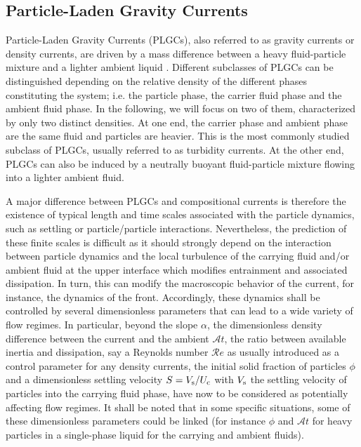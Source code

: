 \documentclass[12pt]{article}
\begin{document}
\subsection{Particle-Laden Gravity Currents}
\label{sec:intro_PLGC}

Particle-Laden Gravity Currents (PLGCs), also referred to as gravity currents or density currents, are driven by a mass difference between a heavy fluid-particle mixture and a lighter ambient liquid \citep[e.g.][]{Hopfinger1983, Middleton1993,Kneller2000, Meiburg2010,wells2021}. Different subclasses of PLGCs can be distinguished depending on the relative density of the different phases constituting the system; i.e. the particle phase, the carrier fluid phase and the ambient fluid phase. In the following, we will focus on two of them, characterized by only two distinct densities. At one end, the carrier phase and ambient phase are the same fluid and particles are heavier. This is the most commonly studied subclass of PLGCs, usually referred to as turbidity currents. At the other end, PLGCs can also be induced by a neutrally buoyant fluid-particle mixture flowing into a lighter ambient fluid.

A major difference between PLGCs and compositional currents is therefore the existence of typical length and time scales associated with the particle dynamics, such as settling or particle/particle interactions. Nevertheless, the prediction of these finite scales is difficult as it should strongly depend on the interaction between particle dynamics and the local turbulence of the carrying fluid and/or ambient fluid at the upper interface which modifies entrainment and associated dissipation. In turn, this can modify the macroscopic behavior of the current, for instance, the dynamics of the front. Accordingly, these dynamics shall be controlled by several dimensionless parameters that can lead to a wide variety of flow regimes. In particular, beyond the slope $\alpha$, the dimensionless density difference between the current and the ambient $\mathcal{A}t$, the ratio between available inertia and dissipation, say a Reynolds number $\mathcal{R}e$ as usually introduced as a control parameter for any density currents, the initial solid fraction of particles $\phi$ and a dimensionless settling velocity $S=V_{\text s}/U_{\text{c}}$ with $V_{\text s}$ the settling velocity of particles into the carrying fluid phase, have now to be considered as potentially affecting flow regimes. It shall be noted that in some specific situations, some of these dimensionless parameters could be linked (for instance $\phi$ and $\mathcal{A}t$ for heavy particles in a single-phase liquid for the carrying and ambient fluids).
\end{document}
